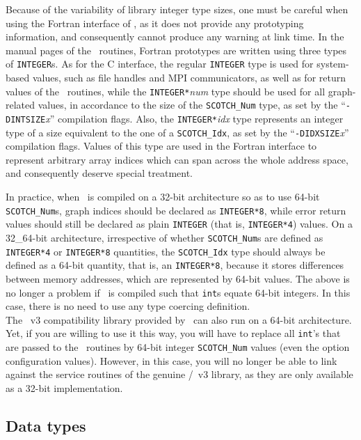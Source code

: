 Because of the variability of library integer type sizes, one must be
careful when using the Fortran interface of \scotch, as it does not
provide any prototyping information, and consequently cannot produce
any warning at link time. In the manual pages of the
\libscotch\ routines, Fortran prototypes are written using three types
of {\tt INTEGER}s. As for the C interface, the regular {\tt INTEGER}
type is used for system-based values, such as file handles and MPI
communicators, as well as for return values of the
\libscotch\ routines, while the {\tt INTEGER*}{\it num} type
should be used for all graph-related values, in accordance to the size
of the {\tt SCOTCH\_\lbt Num} type, as set by the
``{\tt -DINTSIZE}{\it x}'' compilation flags. Also, the
{\tt INTEGER*}{\it idx} type represents an integer type of a size
equivalent to the one of a {\tt SCOTCH\_\lbt Idx}, as set by the
``{\tt -DIDXSIZE}{\it x}'' compilation flags. Values of this type are
used in the Fortran interface to represent arbitrary array indices
which can span across the whole address space, and consequently
deserve special treatment.

In practice, when \scotch\ is compiled on a 32-bit architecture so as
to use 64-bit {\tt SCOTCH\_\lbt Num}s, graph indices should be
declared as {\tt INTEGER*8}, while error return values
should still be declared as plain {\tt INTEGER} (that is,
{\tt INTEGER*4}) values. On a 32\_64-bit architecture, irrespective of
whether {\tt SCOTCH\_\lbt Num}s are defined as {\tt INTEGER*4}
or {\tt INTEGER*8} quantities, the {\tt SCOTCH\_\lbt Idx} type
should always be defined as a 64-bit quantity, that is, an
{\tt INTEGER*8}, because it stores differences between memory
addresses, which are represented by 64-bit values.
The above is no longer a problem if \scotch\ is compiled such that
{\tt int}s equate 64-bit integers. In this case, there is no need to
use any type coercing definition.
\\

The \metis\ v3 compatibility library provided by \scotch\ can also
run on a 64-bit architecture. Yet, if you are willing to use it this
way, you will have to replace all {\tt int}'s that are passed to the
\metis\ routines by 64-bit integer {\tt SCOTCH\_\lbt Num} values (even
the option configuration values). However, in this case, you will no
longer be able to link against the service routines of the genuine
\metis/\parmetis\ v3 library, as they are only available as a 32-bit
implementation.

\subsection{Data types}


